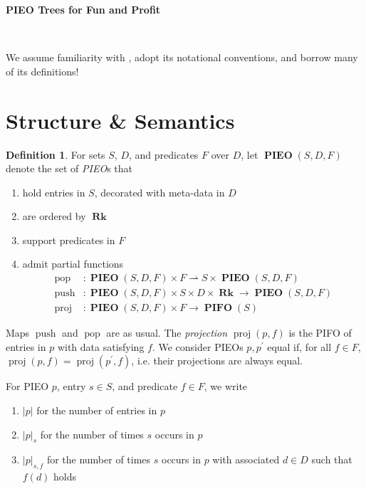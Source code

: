 \documentclass{amsart}
\makeatletter
\DeclareMathOperator{\halfto}{\rightharpoonup}
\DeclareMathOperator{\push}{\mathrm{push}}
\DeclareMathOperator{\pop}{\mathrm{pop}}
\DeclareMathOperator{\proj}{\mathrm{proj}}
\DeclareMathOperator{\Rk}{\mathbf{Rk}}
\DeclareMathOperator{\PIEO}{\mathbf{PIEO}}
\DeclareMathOperator{\PIFO}{\mathbf{PIFO}}
\theoremstyle{definition}
\newtheorem{dfn}[thm]{Definition}
\newcommand{\reqnomode}{\tagsleft@false\let\veqno\@@eqno}
\makeatother
\begin{document}
\pagestyle{empty}

{\LARGE \textbf{PIEO Trees for Fun and Profit}}

\hrulefill\\

\reqnomode

We assume familiarity with \cite{OG}, adopt its notational conventions, and borrow many of its definitions!

\section{Structure \& Semantics}

\begin{dfn}
    \label{dfn:pieo}
    For sets $S$, $D$, and predicates $F$ over $D$,
    let $\PIEO(S, D, F)$ denote the set of \emph{PIEO}s that
    \begin{enumerate}
        \item hold entries in $S$, decorated with meta-data in $D$
        \item are ordered by $\Rk$
        \item support predicates in $F$
        \item admit partial functions 
        \begin{align*}
            \pop &: \PIEO(S, D, F) \times F \halfto S \times \PIEO(S, D, F) \\
            \push &: \PIEO(S, D, F) \times S \times D \times \Rk \to \PIEO(S, D, F) \\
            \proj &: \PIEO(S, D, F) \times F \to \PIFO(S)
        \end{align*}
    \end{enumerate}
    Maps $\push$ and $\pop$ are as usual.
    The \emph{projection} $\proj(p, f)$ is the PIFO of entries in $p$ with data satisfying $f$.
    We consider PIEOs $p, p^\prime$ equal if, for all $f \in F$, $\proj(p,f) = \proj(p^\prime, f)$, i.e. their projections are always equal.

    For PIEO $p$, entry $s \in S$, and predicate $f \in F$, we write 
    \begin{enumerate}
        \item $|p|$ for the number of entries in $p$
        \item $|p|_{s}$ for the number of times $s$ occurs in $p$
        \item $|p|_{s,f}$ for the number of times $s$ occurs in $p$ with associated $d \in D$ such that $f(d)$ holds
    \end{enumerate}
\end{dfn}
\end{document}
